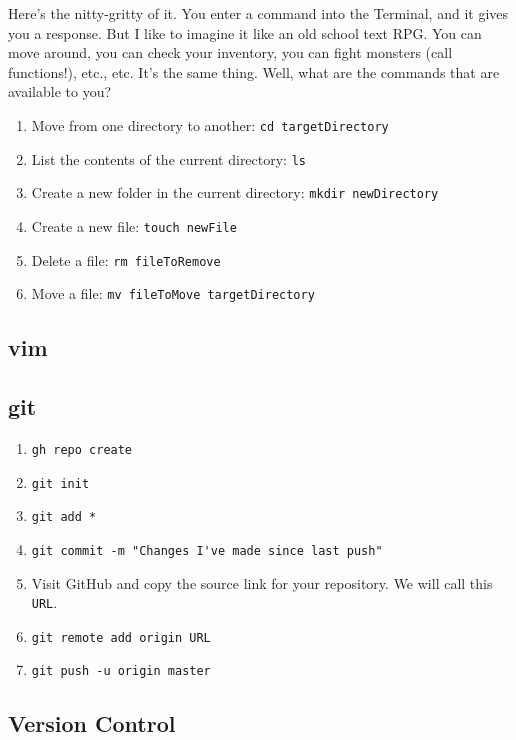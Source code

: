\documentclass[12pt, letterpaper]{article}
\begin{document}
Here's the nitty-gritty of it. You enter a command into the Terminal, and it gives you a response. But I like to imagine it
like an old school text RPG. You can move around, you can check your inventory, you can fight monsters (call functions!),
etc., etc. It's the same thing. Well, what are the commands that are available to you? \\

\begin{enumerate}
    \itemsep0em
    \item{Move from one directory to another: \verb+cd targetDirectory+}
    \item{List the contents of the current directory: \verb+ls+}
    \item{Create a new folder in the current directory: \verb+mkdir newDirectory+}
    \item{Create a new file: \verb+touch newFile+}
    \item{Delete a file: \verb+rm fileToRemove+}
    \item{Move a file: \verb+mv fileToMove targetDirectory+}
\end{enumerate}

\subsection{vim}

\subsection{git}

\begin{enumerate}
    \itemsep0em
    \item{\verb+gh repo create+}
    \item{\verb+git init+}
    \item{\verb+git add *+}
    \item{\verb+git commit -m "Changes I've made since last push"+}
    \item{Visit GitHub and copy the source link for your repository. We will call this \verb+URL+.}
    \item{\verb+git remote add origin URL+}
    \item{\verb+git push -u origin master+}
\end{enumerate}

\subsection{Version Control}
\end{document}
